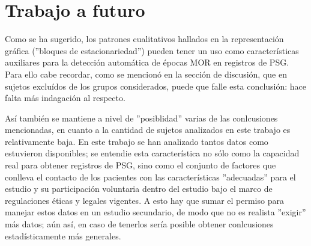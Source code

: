 
\section{Trabajo a futuro}

Como se ha sugerido, los patrones cualitativos hallados en la representaci\'on gr\'afica 
(''bloques de estacionariedad'') pueden tener un uso como 
caracter\'isticas auxiliares
para la detecci\'on autom\'atica de \'epocas MOR en registros de PSG.
Para ello cabe recordar, como se mencion\'o 
en la secci\'on de discusi\'on, que en sujetos exclu\'idos de los grupos considerados, puede
que falle esta conclusi\'on: hace falta m\'as indagaci\'on al respecto. 


As\'i tambi\'en se mantiene a nivel de ''posiblidad'' varias de las conlcusiones mencionadas,
en cuanto a la cantidad de sujetos analizados en este trabajo es relativamente baja.
En este trabajo se han analizado tantos datos como estuvieron disponibles;
se entendie esta caracter\'istica no s\'olo como la 
capacidad real para obtener registros de PSG, sino como el conjunto de factores que conlleva
el contacto de los pacientes con las caracter\'isticas ''adecuadas'' para el estudio y su
participaci\'on voluntaria dentro del estudio bajo el marco de regulaciones \'eticas y legales 
vigentes. A esto hay que sumar el permiso para manejar estos datos en un estudio secundario,
de modo que no es realista ''exigir'' m\'as datos; a\'un as\'i, en caso de tenerlos ser\'ia
posible obtener conlcusiones estad\'isticamente m\'as generales.

